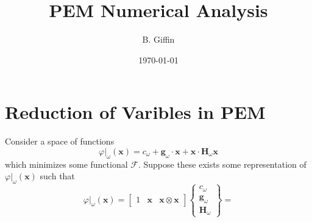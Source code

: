 \documentclass[12pt]{article}
\title{PEM Numerical Analysis}
\author{B. Giffin}
\date{\today}
\begin{document}

\section*{Reduction of Varibles in PEM}

Consider a space of functions
\begin{equation}
	\varphi |_\omega (\mathbf{x}) = c_\omega + \mathbf{g}_\omega \cdot \mathbf{x} + \mathbf{x} \cdot \mathbf{H}_\omega \mathbf{x}
\end{equation}
which minimizes some functional $\mathcal{F}$. Suppose these exists some representation of $\varphi |_\omega (\mathbf{x})$ such that
\begin{equation}
	\varphi |_\omega (\mathbf{x}) = \left[ \begin{array}{ccc} 1 & \mathbf{x} & \mathbf{x} \otimes \mathbf{x} \end{array} \right] \left\{ \begin{array}{c} c_\omega \\ \mathbf{g}_\omega \\ \mathbf{H}_\omega \end{array} \right\} = 
\end{equation}
\end{document}
